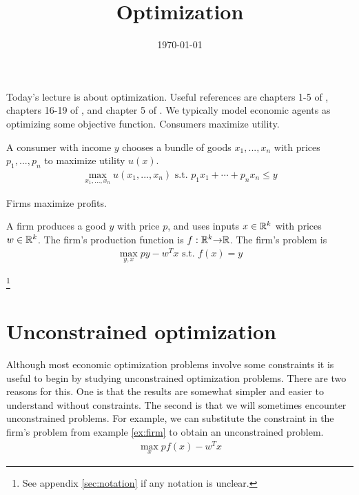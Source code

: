  

\title{Optimization}
\date{\today}



\maketitle

Today's lecture is about optimization. Useful references are chapters
1-5 of \cite{dixit1990}, chapters 16-19 of \cite{sb1994}, and chapter
5 of \cite{carter2001}. We typically model economic
agents as optimizing some objective function. Consumers maximize
utility. 
\begin{example}
  A consumer with income $y$ chooses a bundle of goods $x_1, ...,
  x_n$ with prices $p_1, ..., p_n$ to maximize utility
  $u(x)$.
  \begin{align*}
    \max_{x_1, ..., x_n} u(x_1, ..., x_n) \text{ s.t. } p_1 x_1 +
    \cdots + p_n x_n \leq y
  \end{align*}
\end{example}
Firms maximize profits.
\begin{example}\label{ex:firm}
  A firm produces a good $y$ with price $p$, and
  uses inputs $x \in \mathbb{R}^k$ with prices $w \in \mathbb{R}^k$. The firm's
  production function is $f: \mathbb{R}^k {\rightarrow} \mathbb{R}$. The firm's problem is
  \begin{align*}
    \max_{y,x} py - w^T x \text{ s.t. } f(x) = y 
  \end{align*}
\end{example}
\footnote{See appendix \ref{sec:notation} if any notation is unclear.}

\section{Unconstrained optimization}

Although most economic optimization problems involve some constraints
it is useful to begin by studying unconstrained optimization
problems. There are two reasons for this. One is that the results are
somewhat simpler and easier to understand without constraints. The
second is that we will sometimes encounter unconstrained problems. For
example, we can substitute the constraint in the firm's problem from
example \ref{ex:firm} to obtain an unconstrained problem.
\begin{align*}
  \max_{x} pf(x) - w^T x 
\end{align*}

